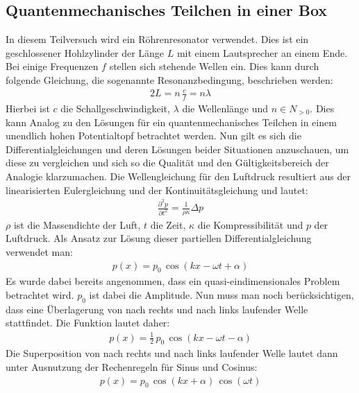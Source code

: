 \documentclass[german,  %
parskip=full,  %
]{scrartcl}
\begin{document}
\subsection{Quantenmechanisches Teilchen in einer Box}
In diesem Teilversuch wird ein Röhrenresonator verwendet. Dies ist ein geschlossener Hohlzylinder der Länge $L$ mit einem Lautsprecher an einem Ende. Bei einige Frequenzen $f$ stellen sich stehende Wellen ein. Dies kann durch folgende Gleichung, die sogenannte Resonanzbedingung, beschrieben werden:
\begin{align}
2L = n \, \frac{c}{f} = n\lambda
\end{align}
Hierbei ist $c$ die Schallgeschwindigkeit, $\lambda$ die Wellenlänge und $n  \in N_{>0}$. Dies kann Analog zu den Lösungen für ein quantenmechanisches Teilchen in einem unendlich hohen Potentialtopf betrachtet werden.
\newline
\newline Nun gilt es sich die Differentialgleichungen und deren Lösungen beider Situationen anzuschauen, um diese zu vergleichen und sich so die Qualität und den Gültigkeitsbereich der Analogie klarzumachen.
\newline
\newline Die Wellengleichung für den Luftdruck resultiert aus der linearisierten Eulergleichung und der Kontinuitätsgleichung und lautet:
\begin{align}
\frac{\partial^2p}{\partial t^2}=\frac{1}{\rho \kappa} \Delta p
\end{align}
$\rho$ ist die Massendichte der Luft, $t$ die Zeit, $\kappa$ die Kompressibilität und $p$ der Luftdruck. Als Ansatz zur Lösung dieser partiellen Differentialgleichung verwendet man:
\begin{align}
p(x)=p_0 \, \cos(kx-\omega t +\alpha)
\end{align}
Es wurde dabei bereits angenommen, dass ein quasi-eindimensionales Problem betrachtet wird. $p_0$ ist dabei die Amplitude. 
Nun muss man noch berücksichtigen, dass eine Überlagerung von nach rechts und nach links laufender Welle stattfindet. Die Funktion lautet daher:
\begin{align}
p(x)=\frac{1}{2}\,p_0 \, \cos(kx-\omega t -\alpha)
\end{align}
Die Superposition von nach rechts und nach links laufender Welle lautet dann unter Ausnutzung der Rechenregeln für Sinus und Cosinus:
\begin{align}
p(x)=p_0 \, \cos(kx+\alpha)\, \cos(\omega t)
\end{align}
\end{document}
